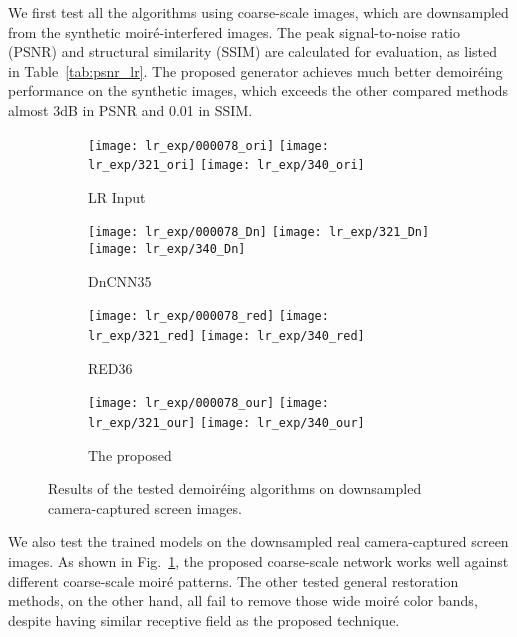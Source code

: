 \documentclass[10pt,twocolumn,letterpaper]{article}
\begin{document}
We first test all the algorithms using coarse-scale images, which are
downsampled from the synthetic moir\'e-interfered images.  The peak
signal-to-noise ratio (PSNR) and structural similarity (SSIM) are
calculated for evaluation, as listed in Table~\ref{tab:psnr_lr}.  The
proposed generator achieves much better demoir\'eing performance on
the synthetic images, which exceeds the other compared methods almost
3dB in PSNR and 0.01 in SSIM.

\begin{figure}[t]
  \begin{subfigure}{0.98\linewidth}
    \centering
    \texttt{[image: lr\_exp/000078\_ori]}
    \texttt{[image: lr\_exp/321\_ori]}
    \texttt{[image: lr\_exp/340\_ori]}
    \caption{LR Input}
  \end{subfigure}
  \begin{subfigure}{0.98\linewidth}
    \centering
    \texttt{[image: lr\_exp/000078\_Dn]}
    \texttt{[image: lr\_exp/321\_Dn]}
    \texttt{[image: lr\_exp/340\_Dn]}
    \caption{DnCNN35}
  \end{subfigure}
  \begin{subfigure}{0.98\linewidth}
    \centering
    \texttt{[image: lr\_exp/000078\_red]}
    \texttt{[image: lr\_exp/321\_red]}
    \texttt{[image: lr\_exp/340\_red]}
    \caption{RED36}
  \end{subfigure}
  \begin{subfigure}{0.98\linewidth}
    \centering
    \texttt{[image: lr\_exp/000078\_our]}
    \texttt{[image: lr\_exp/321\_our]}
    \texttt{[image: lr\_exp/340\_our]}
    \caption{The proposed}
  \end{subfigure}
  \caption{Results of the tested demoir\'eing algorithms on
    downsampled camera-captured screen images.}
  \label{fig:lr_exp}
\end{figure}

We also test the trained models on the downsampled real
camera-captured screen images.  As shown in Fig.~\ref{fig:lr_exp}, the
proposed coarse-scale network works well against different
coarse-scale moir\'e patterns.  The other tested general restoration
methods, on the other hand, all fail to remove those wide moir\'e
color bands, despite having similar receptive field as the proposed
technique.
\end{document}
